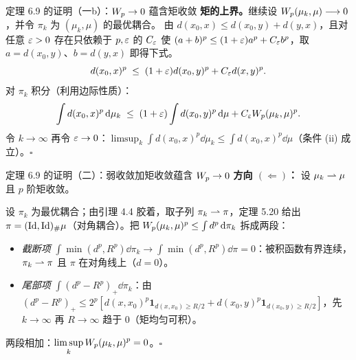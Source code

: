 \begin{frame}{定理 6.9 的证明（一b）：$W_{p}\to0$ 蕴含矩收敛}
  \textbf{矩的上界。}\proofskipnote 继续设 $W_{p}(\mu_{k},\mu)\longrightarrow0$，并令 $\pi_{k}$ 为 $(\mu_{k},\mu)$ 的最优耦合。
   由 $d(x_{0},x)\le d(x_{0},y)+d(y,x)$，且对任意 $\varepsilon>0$ 存在只依赖于 $p,\varepsilon$ 的 $C_{\varepsilon}$ 使 $(a+b)^{p}\le(1+\varepsilon)a^{p}+C_{\varepsilon}b^{p}$，取 $a=d(x_{0},y)$、$b=d(y,x)$ 即得下式。
  \[
    d(x_{0},x)^{p} \;\le\; (1+\varepsilon)d(x_{0},y)^{p} + C_{\varepsilon}d(x,y)^{p}.
  \]
  对 $\pi_{k}$ 积分（利用边际性质）：
  \[
    \int d(x_{0},x)^{p}\,\mathrm{d}\mu_{k}
    \;\le\; (1+\varepsilon)\int d(x_{0},y)^{p}\,\mathrm{d}\mu + C_{\varepsilon}W_{p}(\mu_{k},\mu)^{p}.
  \]
  令 $k\to\infty$ 再令 $\varepsilon\to0$：$\limsup_{k}\int d(x_{0},x)^{p}\dd\mu_{k}\le\int d(x_{0},x)^{p}\dd\mu$（条件 (ii) 成立）。$\square$

\end{frame}

\begin{frame}{定理 6.9 的证明（二）：弱收敛加矩收敛蕴含 $W_{p}\to0$}
  \textbf{方向 $(\Leftarrow)$：} 设 $\mu_{k}\rightharpoonup\mu$ 且 $p$ 阶矩收敛。\proofskipnote

  设 $\pi_{k}$ 为最优耦合；由引理 4.4 胶着，取子列 $\pi_{k}\rightharpoonup\pi$，定理 5.20 给出 $\pi=(\mathrm{Id},\mathrm{Id})_{\#}\mu$（对角耦合）。把 $W_{p}(\mu_k,\mu)^p\le\int d^p\,\mathrm{d}\pi_k$ 拆成两段：
  \begin{itemize}\small
    \item \emph{截断项} $\int\min(d^p,R^p)\dd\pi_k\to\int\min(d^p,R^p)\dd\pi=0$：被积函数有界连续，$\pi_k\rightharpoonup\pi$ 且 $\pi$ 在对角线上（$d=0$）。
    \item \emph{尾部项} $\int(d^p-R^p)_+\dd\pi_k$：由 $(d^p{-}R^p)_+\le 2^p[d(x,x_0)^p\mathbf{1}_{d(x,x_0)\ge R/2}+d(x_0,y)^p\mathbf{1}_{d(x_0,y)\ge R/2}]$，先 $k\to\infty$ 再 $R\to\infty$ 趋于 $0$（矩均匀可积）。
  \end{itemize}
  两段相加：$\displaystyle\limsup_{k}W_{p}(\mu_{k},\mu)^{p} = 0$。\hfill$\square$

\end{frame}

